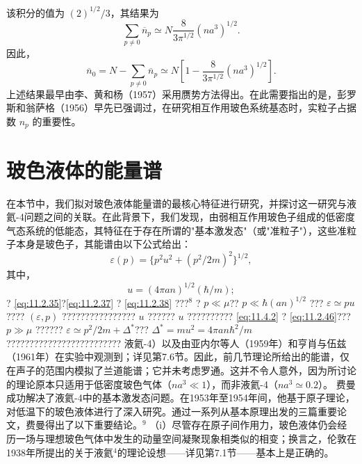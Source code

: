 该积分的值为 \((2)^{1/2}/3\)，其结果为
\begin{equation}\tag{11.2.52}\label{eq:11.2.52}
\sum _ { p \neq 0 } \overline { { n } } _ { p } \simeq N \frac { 8 } { 3 \pi ^{1 / 2} } ( n a ^{3} ) ^{1 / 2} .
\end{equation}
因此，
\begin{equation}\tag{11.2.53}\label{eq:11.2.53}
\overline { { n } } _ { 0 } = N - \sum _ { p \neq 0 } \overline { { n } } _ { p } \simeq N \left[ 1 - \frac { 8 } { 3 \pi ^{1 / 2} } ( n a ^{3} ) ^{1 / 2} \right] .
\end{equation}
上述结果最早由李、黄和杨（1957）采用赝势方法得出。在此需要指出的是，彭罗斯和翁萨格（1956）早先已强调过，在研究相互作用玻色系统基态时，实粒子占据数 \(n_{p}\) 的重要性。
\section{玻色液体的能量谱}\label{ux73bbux8272ux6db2ux4f53ux7684ux80fdux91cfux8c31}
在本节中，我们拟对玻色液体能量谱的最核心特征进行研究，并探讨这一研究与液氦-4问题之间的关联。在此背景下，我们发现，由弱相互作用玻色子组成的低密度气态系统的低能态，其特征在于存在所谓的"基本激发态"（或"准粒子"），这些准粒子本身是玻色子，其能谱由以下公式给出：
\begin{equation}\tag{11.4.1}\label{eq:11.4.1}
\varepsilon ( p ) = \{ p ^{2} u ^{2} + ( p ^{2} / 2 m ) ^{2} \} ^{1 / 2} ,
\end{equation}
其中，
\begin{equation}\tag{11.4.2}\label{eq:11.4.2}
u = ( 4 \pi a n ) ^{1 / 2} ( \hbar / m ) ;
\end{equation}
? \autoref{eq:11.2.35}?\autoref{eq:11.2.37} ? \autoref{eq:11.2.38} ???\(^{8}\) ? \(p \ll \mu\)?? \(p \ll \hbar(an)^{1/2}\) ??? \(\varepsilon \simeq pu\)???? \((\varepsilon,p)\) ???????????????? \(u\) ?????? \(u\) ?????????? \autoref{eq:11.4.2} ? \autoref{eq:11.2.46}??? \(p \gg \mu\) ?????? \(\varepsilon \simeq p^{2}/2m + \Delta^{*}\)??? \(\Delta^{*}=mu^{2}=4\pi an\hbar^{2}/m\)?????????????????????????
液氦-4）以及由亚内尔等人（1959年）和亨肖与伍兹（1961年）在实验中观测到；详见第7.6节。因此，前几节理论所给出的能谱，仅在声子的范围内模拟了兰道能谱；它并未考虑罗通。这并不令人意外，因为所讨论的理论原本只适用于低密度玻色气体（\(na^{3} \ll 1\)），而非液氦-4（\(na^{3} \simeq 0.2\)）。
费曼成功解决了液氦-4中的基本激发态问题。在1953年至1954年间，他基于原子理论，对低温下的玻色液体进行了深入研究。通过一系列从基本原理出发的三篇重要论文，费曼得出了以下重要结论。\(^{9}\)
（i）尽管存在原子间作用力，玻色液体仍会经历一场与理想玻色气体中发生的动量空间凝聚现象相类似的相变；换言之，伦敦在1938年所提出的关于液氦\(^{4}\)的理论设想——详见第7.1节——基本上是正确的。
